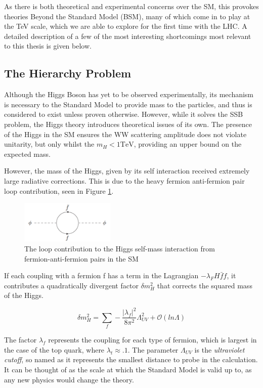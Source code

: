 As there is both theoretical and experimental concerns over the SM, this provokes theories Beyond the Standard Model (BSM), many of which come in to play at the TeV scale, which we are able to explore for the first time with the LHC. A detailed description of a few of the most interesting shortcomings most relevant to this thesis is given below.

\subsection{The Hierarchy Problem}
Although the Higgs Boson has yet to be observed experimentally, its mechanism is necessary to the Standard Model to provide mass to the particles, and thus is considered to exist unless proven otherwise. However, while it solves the SSB problem, the Higgs theory introduces theoretical issues of its own. The presence of the Higgs in the SM ensures the WW scattering amplitude does not violate unitarity, but only whilst the $m_{H} < 1 \textrm{TeV}$, providing an upper bound on the expected mass\cite{WWHMass}. 

However, the mass of the Higgs, given by its self interaction received extremely large radiative corrections. This is due to the heavy fermion anti-fermion pair loop contribution, seen in Figure \ref{fig:hiloop}. 

\begin{figure}
\centering
\includegraphics[width=0.4\textwidth]{Figures/Theory/higgsself}
\caption{\label{fig:hiloop}The loop contribution to the Higgs self-mass interaction from fermion-anti-fermion pairs in the SM}
\end{figure}

If each coupling with a fermion f has a term in the Lagrangian $-\lambda_{F} H \bar{f}f$, it contributes a quadratically divergent factor $\delta m^{2}_{H}$ that corrects the squared mass of the Higgs. 

\begin{equation}
\delta m^{2}_{H} =\sum_{f} - \frac{|\lambda_{f}|^{2}}{8 \pi^{2}}\Lambda^{2}_{UV} + \mathcal{O}(ln\Lambda)
\label{eqn:HIGGQUAD}
\end{equation}

The factor $\lambda_{f}$  represents the coupling for each type of fermion, which is largest in the case of the top quark, where $\lambda_{t} \approx. 1$. The parameter $\Lambda_{UV}$ is the \textit{ultraviolet cutoff}, so named as it represents the smallest distance to probe in the calculation. It can be thought of as the scale at which the Standard Model is valid up to, as any new physics would change the theory.


